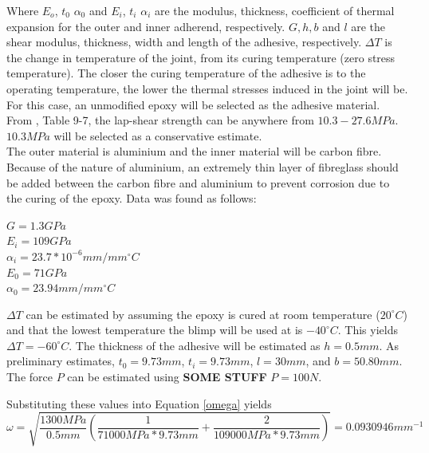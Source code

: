 \documentclass[../main.tex]{subfiles}
\begin{document}
Where $E_o$, $t_0$ $\alpha _0$ and $E_i$, $t_i$ $\alpha _i$ are the modulus, thickness, coefficient of thermal expansion for the outer and inner adherend, respectively. $G, h, b$ and $l$ are the shear modulus, thickness, width and length of the adhesive, respectively. $\Delta T$ is the change in temperature of the joint, from its curing temperature (zero stress temperature). The closer the curing temperature of the adhesive is to the operating temperature, the lower the thermal stresses induced in the joint will be.\\

For this case, an unmodified epoxy will be selected as the adhesive material. From \cite{shigley}, Table 9-7, the lap-shear strength can be anywhere from $10.3-27.6MPa$. $10.3 MPa$ will be selected as a conservative estimate.\\

The outer material is aluminium and the inner material will be carbon fibre. Because of the nature of aluminium, an extremely thin layer of fibreglass should be added between the carbon fibre and aluminium to prevent corrosion due to the curing of the epoxy. Data was found as follows:

\begin{center}
$G=1.3 GPa$ \cite{epoxyShear}\\
$E_i=109GPa$ \cite{carbonFibre}\\
$\alpha _i=23.7*10^{-6}mm/mm^{\circ}C$ \cite{carbonFibre}\\
$E_0=71GPa$ \cite{shigley}\\
$\alpha _0=23.94 mm/mm^{\circ}C$ \cite{shigley}\\
\end{center}

$\Delta T$ can be estimated by assuming the epoxy is cured at room temperature ($20 ^{\circ}C$) and that the lowest temperature the blimp will be used at is  $-40 ^{\circ}C$. This yields $\Delta T = -60^{\circ}C$. The thickness of the adhesive will be estimated as $h=0.5mm$. As preliminary estimates, $t_0= 9.73mm$, $t_i= 9.73mm$, $l=30mm$, and $b=50.80mm$. The force $P$ can be estimated using \textbf{SOME STUFF} $P=100N$.

Substituting these values into Equation \ref{omega} yields
\begin{equation} \label{omegaSolve}
\omega = \sqrt{\dfrac{1300 MPa}{0.5mm}\left(\dfrac{1}{71000MPa*9.73mm}+\dfrac{2}{109000 MPa*9.73mm}\right)} = 0.0930946mm^{-1}
\end{equation}
\end{document}

